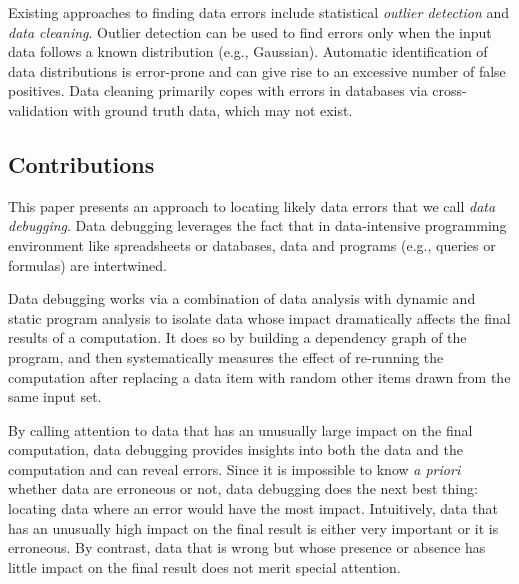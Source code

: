 
Existing approaches to finding data errors include
statistical \emph{outlier detection} and \emph{data cleaning}. Outlier
detection can be used to find errors only when the input data follows
a known distribution (e.g., Gaussian). Automatic identification of
data distributions is error-prone and can give rise to an excessive
number of false positives. Data cleaning primarily copes with errors
in databases via cross-validation with ground truth data, which may
not exist.

\subsection*{Contributions}

This paper presents an approach to locating likely data errors that we
call \emph{data debugging}. Data debugging leverages the fact that in
data-intensive programming environment like spreadsheets or databases,
data and programs (e.g., queries or formulas) are intertwined.


Data debugging works via a combination of data analysis with dynamic
and static program analysis to isolate data whose impact dramatically
affects the final results of a computation. It does so by building a
dependency graph of the program, and then systematically measures the
effect of re-running the computation after replacing a data item with
random other items drawn from the same input set.

By calling attention to data that has an unusually large impact on the
final computation, data debugging provides insights into both the data
and the computation and can reveal errors. Since it is impossible to
know \emph{a priori} whether data are erroneous or not, data debugging
does the next best thing: locating data where an error would have the
most impact. Intuitively, data that has an unusually high impact on
the final result is either very important or it is erroneous. By
contrast, data that is wrong but whose presence or absence has little
impact on the final result does not merit special attention.

